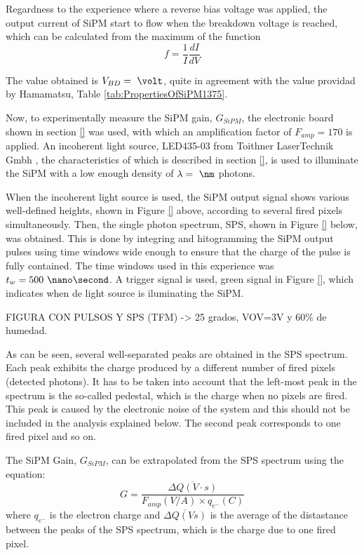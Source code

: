 Regardness to the experience where a reverse bias voltage was applied, the output current of SiPM start to flow when the breakdown voltage is reached, which can be calculated from the maximum of the function 
\begin{equation}
f=\frac{1}{I}\frac{dI}{dV}
\label{BreakDownVoltageFunction}
\end{equation}

The value obtained is $V_{BD}=~\volt$, quite in agreement with the value providad by Hamamatsu, Table \ref{tab:PropertiesOfSiPM1375}.

Now, to experimentally measure the SiPM gain, $G_{SiPM}$, the electronic board shown in section \ref{} was used, with which an amplification factor of $F_{amp}=170$ is applied. An incoherent light source, LED435-03 from Toithner LaserTechnik Gmbh \cite{LEDRLT}, the characteristics of which is described in section \ref{}, is used to illuminate the SiPM with a low enough density of $\lambda= ~\nm$ photons.

When the incoherent light source is used, the SiPM output signal shows various well-defined heights, shown in Figure \ref{} above, according to several fired pixels simultaneously. Then, the single photon spectrum, SPS, shown in Figure \ref{} below, was obtained. This is done by integring and hitogramming the SiPM output pulses using time windows wide enough to ensure that the charge of the pulse is fully contained. The time windows used in this experience was $t_w= 500~\nano\second$. A trigger signal is used, green signal in Figure \ref{}, which indicates when de light source is iluminating the SiPM.

FIGURA CON PULSOS Y SPS (TFM) -> 25 grados, VOV=3V y 60\% de humedad.

As can be seen, several well-separated peaks are obtained in the SPS spectrum. Each peak exhibits the charge produced by a different number of fired pixels (detected photons). It has to be taken into account that the left-most peak in the spectrum is the so-called pedestal, which is the charge when no pixels are fired. This peak is caused by the electronic noise of the system and this should not be included in the analysis explained below. The second peak corresponds to one fired pixel and so on.

The SiPM Gain, $G_{SiPM}$, can be extrapolated from the SPS spectrum using the equation:
\begin{equation}
G=\frac{\overline{\Delta Q (V \cdot{} s)}}{F_{amp}(V/A) \times q_{e^-}(C)}
\label{SiPMGain}
\end{equation}
where $q_{e^-}$ is the electron charge and $\overline{\Delta Q (Vs)}$ is the average of the distastance between the peaks of the SPS spectrum, which is the charge due to one fired pixel. 


